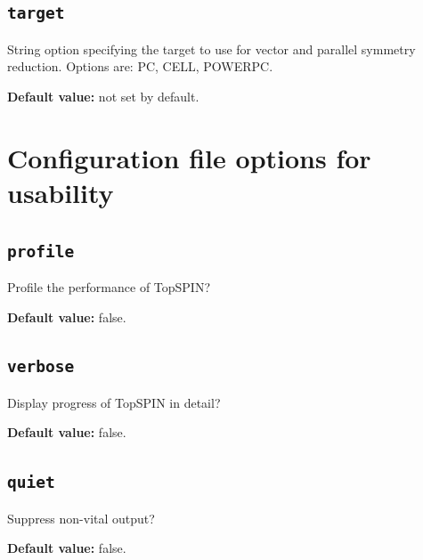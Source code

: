 \subsection{\texttt{target}}\label{sec:overview:symmetryreductionconfig:target}

String option specifying the target to use for vector and parallel symmetry reduction.  Options are: PC, CELL, POWERPC.

\noindent\textbf{Default value: } not set by default.

\section{Configuration file options for usability}

\subsection{\texttt{profile}}

Profile the performance of TopSPIN?

\noindent\textbf{Default value: } false.

\subsection{\texttt{verbose}}

Display progress of TopSPIN in detail?

\noindent\textbf{Default value: } false.

\subsection{\texttt{quiet}}

Suppress non-vital output?

\noindent\textbf{Default value: } false.
